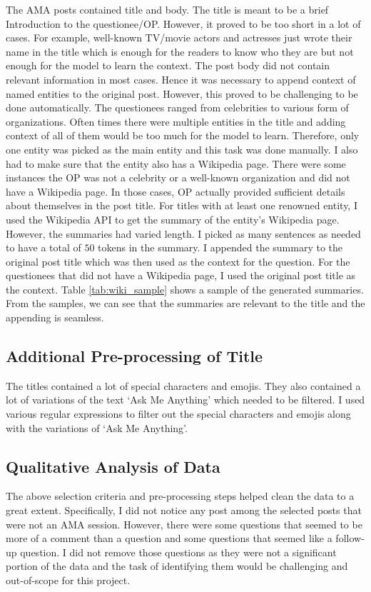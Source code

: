 \documentclass[paper=a4, fontsize=11pt]{scrartcl}
\numberwithin{equation}{section}		%
\numberwithin{figure}{section}			%
\numberwithin{table}{section}				%
\begin{document}
The AMA posts contained title and body.
The title is meant to be a brief Introduction to the questionee/OP.
However, it proved to be too short in a lot of cases.
For example, well-known TV/movie actors and actresses just wrote their name in the title which is enough for the readers to know who they are but not enough for the model to learn the context.
The post body did not contain relevant information in most cases.
Hence it was necessary to append context of named entities to the original post.
However, this proved to be challenging to be done automatically.
The questionees ranged from celebrities to various form of organizations.
Often times there were multiple entities in the title and adding context of all of them would be too much for the model to learn.
Therefore, only one entity was picked as the main entity and this task was done manually.
I also had to make sure that the entity also has a Wikipedia page.
There were some instances the OP was not a celebrity or a well-known organization and did not have a Wikipedia page.
In those cases, OP actually provided sufficient details about themselves in the post title.
For titles with at least one renowned entity, I used the Wikipedia API to get the summary of the entity's Wikipedia page.
However, the summaries had varied length.
I picked as many sentences as needed to have a total of $50$ tokens in the summary.
I appended the summary to the original post title which was then used as the context for the question.
For the questionees that did not have a Wikipedia page, I used the original post title as the context.
Table \ref{tab:wiki_sample} shows a sample of the generated summaries.
From the samples, we can see that the summaries are relevant to the title and the appending is seamless.


\subsection*{Additional Pre-processing of Title}
The titles contained a lot of special characters and emojis.
They also contained a lot of variations of the text `Ask Me Anything' which needed to be filtered.
I used various regular expressions to filter out the special characters and emojis along with the variations of `Ask Me Anything'.


\subsection*{Qualitative Analysis of Data}
The above selection criteria and pre-processing steps helped clean the data to a great extent.
Specifically, I did not notice any post among the selected posts that were not an AMA session.
However, there were some questions that seemed to be more of a comment than a question and some questions that seemed like a follow-up question.
I did not remove those questions as they were not a significant portion of the data and the task of identifying them would be challenging and out-of-scope for this project.
\end{document}
